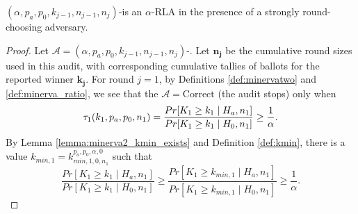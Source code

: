 \begin{theorem}
\label{thm:minerva2_is_rla_new}
$(\alpha,p_a, p_0,k_{j-1},n_{j-1},n_j)$-\Providence is an
$\alpha$-RLA in the presence of a strongly round-choosing adversary.
\end{theorem}
\begin{proof}
Let $\mathcal{A}=(\alpha,p_a, p_0,k_{j-1},n_{j-1},n_j)$-\Providence.
Let $\bm{n_j}$ be the cumulative round sizes used in this
audit, with corresponding cumulative tallies of
ballots for the reported winner $\bm{k_j}$.
For round $j=1$, by Definitions \ref{def:minervatwo}
and \ref{def:minerva_ratio}, we see that
the $\mathcal{A}=\text{Correct}$ (the audit stops) only when
$$
\tau_1(k_{1},p_a,p_0,n_1)\\
=\frac{Pr[K_{1} \geq k_{1} \mid H_a, n_1]}{Pr[K_{1} \geq k_{1} \mid H_0, n_1]}
\ge \frac{1}{\alpha}.
$$
By Lemma \ref{lemma:minerva2_kmin_exists} and Definition \ref{def:kmin}, there is 
a value $k_{min,1} = k^{p_a, p_0, \alpha, 0}_{min, 1, 0, n_1}$ such that 
$$
\frac{Pr[K_{1} \geq k_{1} \mid H_a, n_1]}{Pr[K_{1} \geq k_{1} \mid H_0, n_1]}
\ge
\frac{Pr[K_{1} \geq k_{min,1} \mid H_a, n_1]}{Pr[K_{1} \geq k_{min, 1} \mid H_0, n_1]}
\ge 
\frac{1}{\alpha}.
$$


\end{proof}
